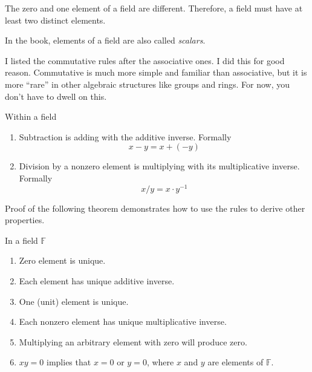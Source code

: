 \begin{note}
	The zero and one element of a field are different. Therefore, a field must have at least two distinct elements.

	In the book, elements of a field are also called \textit{scalars}.

	I listed the commutative rules after the associative ones. I did this for good reason. Commutative is much more simple and familiar than associative, but it is more ``rare'' in other algebraic structures like groups and rings. For now, you don't have to dwell on this.
\end{note}

\begin{definition}
	Within a field
	\begin{enumerate}
		\item Subtraction is adding with the additive inverse. Formally
		      \[
			      x - y = x + (-y)
		      \]
		\item Division by a nonzero element is multiplying with its multiplicative inverse. Formally
		      \[
			      x / y = x\cdot y^{-1}
		      \]
	\end{enumerate}
\end{definition}

Proof of the following theorem demonstrates how to use the rules to derive other properties.

\begin{theorem}\label{thm:properties-of-field}
	In a field $\mathbb{F}$
	\begin{enumerate}[label = (\roman*)]
		\item Zero element is unique.
		\item Each element has unique additive inverse.
		\item One (unit) element is unique.
		\item Each nonzero element has unique multiplicative inverse.
		\item Multiplying an arbitrary element with zero will produce zero.
		\item $xy = 0$ implies that $x = 0$ or $y = 0$, where $x$ and $y$ are elements of $\mathbb{F}$.
	\end{enumerate}
\end{theorem}

